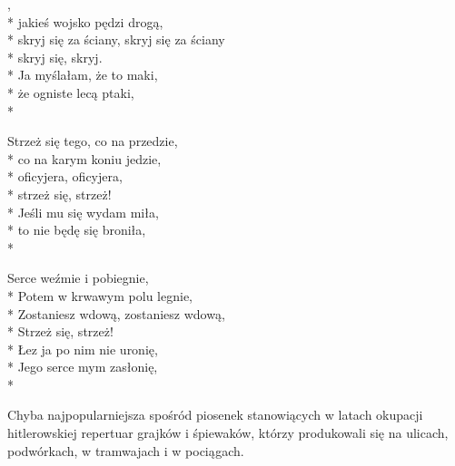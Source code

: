 
\begin{lyrics}[longestline={niech mnie zabiera, zabiera, zabiera.}]

,\\*
jakieś wojsko pędzi drogą,\\*
skryj się za ściany, skryj się za ściany\\*
skryj się, skryj.\\*
\vin Ja myślałam, że to maki,\\*
\vin że ogniste lecą ptaki,\\*

Strzeż się tego, co na przedzie,\\*
co na karym koniu jedzie,\\*
oficyjera, oficyjera,\\*
strzeż się, strzeż!\\*
\vin Jeśli mu się wydam miła,\\*
\vin to nie będę się broniła,\\*

Serce weźmie i pobiegnie,\\*
Potem w krwawym polu legnie,\\*
Zostaniesz wdową, zostaniesz wdową,\\*
Strzeż się, strzeż!\\*
\vin Łez ja po nim nie uronię,\\*
\vin Jego serce mym zasłonię,\\*
\end{lyrics}

\begin{info}Chyba najpopularniejsza spośród piosenek stanowiących w latach okupacji hitlerowskiej repertuar grajków i śpiewaków, którzy produkowali się na ulicach, podwórkach, w tramwajach i w pociągach. \end{info}

